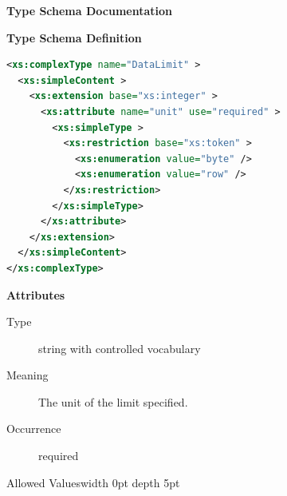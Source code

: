 \documentclass{ivoa}
\begin{document}
\begin{generated}
\begingroup
        \renewcommand*\descriptionlabel[1]{%
        \hbox to 5.5em{\emph{#1}\hfil}}\vspace{2ex}\noindent\textbf{ Type Schema Documentation}


\vspace{1ex}\noindent\textbf{ Type Schema Definition}

\begin{lstlisting}[language=XML,basicstyle=\footnotesize]
<xs:complexType name="DataLimit" >
  <xs:simpleContent >
    <xs:extension base="xs:integer" >
      <xs:attribute name="unit" use="required" >
        <xs:simpleType >
          <xs:restriction base="xs:token" >
            <xs:enumeration value="byte" />
            <xs:enumeration value="row" />
          </xs:restriction>
        </xs:simpleType>
      </xs:attribute>
    </xs:extension>
  </xs:simpleContent>
</xs:complexType>
\end{lstlisting}

\vspace{0.5ex}\noindent\textbf{ Attributes}

\begingroup\small\begin{bigdescription}
\item[unit]
\begin{description}
\item[Type] string with controlled vocabulary
\item[Meaning] The unit of the limit specified.
\item[Occurrence] required

\item[Allowed Values\vrule width 0pt depth 5pt]\hfil
           \begin{longtermsdescription}\item[byte]
\item[row]
\end{longtermsdescription}
\end{description}


\end{bigdescription}\endgroup

\endgroup
\end{generated}

\end{document}
